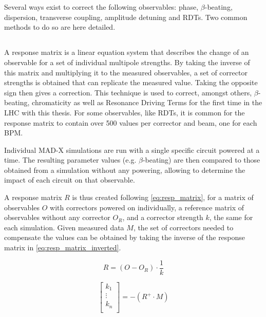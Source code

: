 \section{}

Several ways exist to correct the following observables: phase, $\beta$-beating, dispersion,
transverse coupling, amplitude detuning and RDTs. Two common methods to do so are here detailed.

\subsection{}
\label{correction_principle:response_matrix}

A response matrix is a linear equation system that describes the change of an observable for a set
of individual multipole strengths. By taking the inverse of this matrix and multiplying it to the
measured observables, a set of corrector strengths is obtained that can replicate the measured
value. Taking the opposite sign then gives a correction. This technique is used to correct, amongst
others, $\beta$-beating, chromaticity as well as Resonance Driving Terms for the first time in the
LHC with this thesis. 
For some observables, like RDTs, it is common for the response matrix to contain over 500 values per
corrector and beam, one for each BPM.

Individual MAD-X simulations are run with a single specific circuit powered at a time. The resulting
parameter values (e.g. $\beta$-beating) are then compared to those obtained from a simulation
without any powering, allowing to determine the impact of each circuit on that observable.

A response matrix $R$ is thus created following \cref{eq:resp_matrix}, for a matrix of observables
$O$ with correctors powered on individually, a reference matrix of observables without any corrector
$O_R$, and a corrector strength $k$, the same for each simulation. Given measured data $M$, the set
of correctors needed to compensate the values can be obtained by taking the inverse of the response
matrix in \cref{eq:resp_matrix_inverted}.

\begin{equation}
  R = \left(O - O_R \right) \cdot \frac{1}{k}
  \label{eq:resp_matrix}
\end{equation}

\begin{equation}
  \begin{bmatrix}
    k_1 \\
    \vdots \\
    k_n \\
  \end{bmatrix}
  = -(R^{+} \cdot M)
  \label{eq:resp_matrix_inverted}
\end{equation}
 

